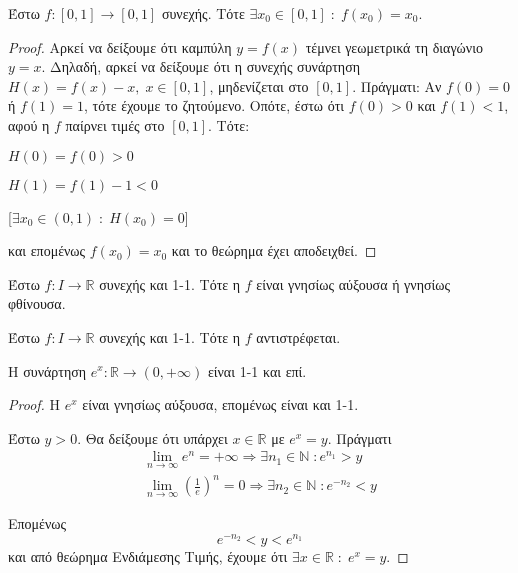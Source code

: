\documentclass[main.tex]{subfiles}
\begin{document}
\begin{thm}
    Έστω $ f \colon [0,1] \to [0,1] $ συνεχής. Τότε $ \exists x_{0} \in [0,1] \; 
    : \; f(x_{0}) = x_{0} $.
\end{thm}

\begin{proof}
\item {}
    Αρκεί να δείξουμε ότι καμπύλη $ y= f(x) $ τέμνει γεωμετρικά τη διαγώνιο $ y=x $.
    Δηλαδή, αρκεί να δείξουμε ότι η συνεχής συνάρτηση $ H(x) = f(x)-x, \; x \in [0,1] $, 
    μηδενίζεται στο $ [0,1] $. Πράγματι:
    Αν $ f(0)=0 $ ή $ f(1)= 1 $, τότε έχουμε το ζητούμενο. Οπότε, έστω ότι 
    $ f(0) > 0 $ και $ f(1)<1 $, αφού η $ f $ παίρνει τιμές στο $ [0,1] $. Τότε:

    \begin{minipage}{0.3\textwidth}
        \begin{myitemize}
        \item $ H(0) = f(0) > 0 $ \hfill {}
        \item $ H(1) = f(1)-1 < 0 $ \hfill {}
        \end{myitemize}
    \end{minipage}
    [$ \exists x_{0} \in (0,1) \; : \; H(x_{0}) = 0$]

    και επομένως $ f(x_{0}) = x_{0} $ και το θεώρημα έχει αποδειχθεί.
\end{proof}

\begin{thm}
    Έστω $ f \colon I \to \mathbb{R} $ συνεχής και 1-1. Τότε η $f$ είναι 
    γνησίως αύξουσα ή γνησίως φθίνουσα.
\end{thm}

\begin{thm}
    Έστω $ f \colon I \to \mathbb{R} $ συνεχής και 1-1. Τότε η $f$ αντιστρέφεται.
\end{thm}

\begin{prop}
    Η συνάρτηση $ e^{x} \colon \mathbb{R} \to (0,+\infty) $ είναι 1-1 και επί.
\end{prop}

\begin{proof}
\item {}
    Η $ e^{x} $ είναι γνησίως αύξουσα, επομένως είναι και 1-1.

    Έστω $ y>0 $. Θα δείξουμε ότι υπάρχει $ x \in \mathbb{R} $ με $ e^{x}=y $. Πράγματι
    \begin{gather*}
        \lim_{n \to \infty} e^{n} = + \infty \Rightarrow \exists n_{1} \in 
        \mathbb{N} \; : e^{n_{1}} > y \\
        \lim_{n \to \infty} \left(\frac{1}{e}\right)^{n} = 0 \Rightarrow \exists n_{2} 
        \in \mathbb{N} \; : e^{- n_{2}} < y 
    \end{gather*} 

    Επομένως 
    \[
        e^{- n_{2}} < y < e^{n_{1}}
    \] 
    και από θεώρημα Ενδιάμεσης Τιμής, έχουμε ότι $ \exists x \in \mathbb{R} \; : \; 
    e^{x} = y$.
\end{proof}
\end{document}
